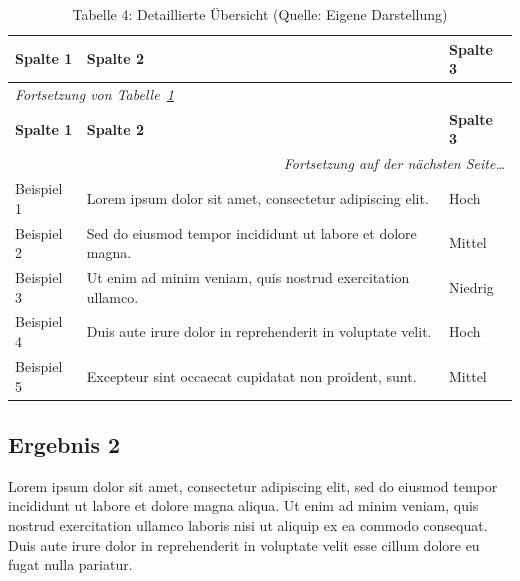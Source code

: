 \begin{longtable}
	{|p{3cm}|p{5.5cm}|p{4cm}|}
	\caption[Tabelle 4: Detaillierte Übersicht]{Tabelle 4: Detaillierte Übersicht (Quelle:
	Eigene Darstellung)}
	\label{tab:tabelle4-longtable}\\ \hline \textbf{Spalte 1} & \textbf{Spalte 2}
	& \textbf{Spalte 3} \\ \hline \endfirsthead \multicolumn{3}{l}{\small\textit{Fortsetzung
	von Tabelle~\ref{tab:tabelle4-longtable}}}\\ \hline \textbf{Spalte 1} & \textbf{Spalte
	2} & \textbf{Spalte 3} \\ \hline \endhead \hline \multicolumn{3}{r}{\small\textit{Fortsetzung
	auf der nächsten Seite\ldots}}\\ \endfoot \hline \endlastfoot Beispiel 1 &
	Lorem ipsum dolor sit amet, consectetur adipiscing elit. & Hoch \\ \hline
	Beispiel 2 & Sed do eiusmod tempor incididunt ut labore et dolore magna. & Mittel
	\\ \hline Beispiel 3 & Ut enim ad minim veniam, quis nostrud exercitation
	ullamco. & Niedrig \\ \hline Beispiel 4 & Duis aute irure dolor in reprehenderit
	in voluptate velit. & Hoch \\ \hline Beispiel 5 & Excepteur sint occaecat
	cupidatat non proident, sunt. & Mittel \\ \hline
\end{longtable}

\subsection{Ergebnis 2}
\label{sec:ergebnis2}

Lorem ipsum dolor sit amet, consectetur adipiscing elit, sed do eiusmod tempor
incididunt ut labore et dolore magna aliqua. Ut enim ad minim veniam, quis
nostrud exercitation ullamco laboris nisi ut aliquip ex ea commodo consequat. Duis
aute irure dolor in reprehenderit in voluptate velit esse cillum dolore eu fugat
nulla pariatur.\autocite[Vgl.][S. 100]{muster:artikel:2022}


